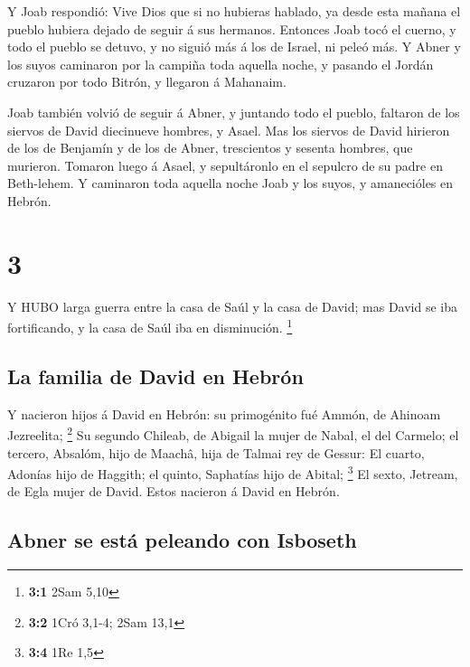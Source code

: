  Y Joab respondió: Vive Dios que si no hubieras hablado, ya
desde esta mañana el pueblo hubiera dejado de seguir á sus hermanos.
 Entonces Joab tocó el cuerno, y todo el pueblo se detuvo,
y no siguió más á los de Israel, ni peleó más.  Y Abner y
los suyos caminaron por la campiña toda aquella noche, y pasando el
Jordán cruzaron por todo Bitrón, y llegaron á Mahanaim.

 Joab también volvió de seguir á Abner, y juntando todo el
pueblo, faltaron de los siervos de David diecinueve hombres, y Asael.
 Mas los siervos de David hirieron de los de Benjamín y de
los de Abner, trescientos y sesenta hombres, que murieron. Tomaron luego
á Asael, y sepultáronlo en el sepulcro de su padre en Beth-lehem.
 Y caminaron toda aquella noche Joab y los suyos, y
amanecióles en Hebrón.

\hypertarget{section-2}{%
\section{3}\label{section-2}}

 Y HUBO larga guerra entre la casa de Saúl y la casa de
David; mas David se iba fortificando, y la casa de Saúl iba en
disminución. \footnote{\textbf{3:1} 2Sam 5,10}

\hypertarget{la-familia-de-david-en-hebruxf3n}{%
\subsection{La familia de David en
Hebrón}\label{la-familia-de-david-en-hebruxf3n}}

 Y nacieron hijos á David en Hebrón: su primogénito fué
Ammón, de Ahinoam Jezreelita; \footnote{\textbf{3:2} 1Cró 3,1-4; 2Sam
  13,1}  Su segundo Chileab, de Abigail la mujer de Nabal,
el del Carmelo; el tercero, Absalóm, hijo de Maachâ, hija de Talmai rey
de Gessur:  El cuarto, Adonías hijo de Haggith; el quinto,
Saphatías hijo de Abital; \footnote{\textbf{3:4} 1Re 1,5} 
El sexto, Jetream, de Egla mujer de David. Estos nacieron á David en
Hebrón.

\hypertarget{abner-se-estuxe1-peleando-con-isboseth}{%
\subsection{Abner se está peleando con
Isboseth}\label{abner-se-estuxe1-peleando-con-isboseth}}

